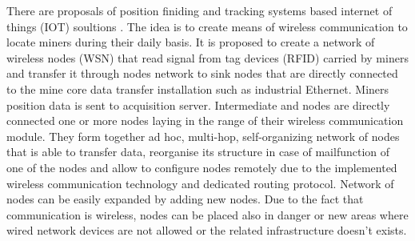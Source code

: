 \documentclass[../main.tex]{subfiles}
\begin{document}
There are proposals of position finiding and tracking systems based internet of things (IOT) soultions \cite{WSN_tracking, WSN_monitoring}. The idea is to create means of wireless communication to locate miners during their daily basis. It is proposed to create a network of wireless nodes (WSN) that read signal from tag devices (RFID) carried by miners and transfer it through nodes network to sink nodes that are directly connected to the mine core data transfer installation such as industrial Ethernet. Miners position data is sent to acquisition server. Intermediate and nodes are directly connected one or more nodes laying in the range of their wireless communication module. They form together ad hoc, multi-hop, self-organizing network of nodes that is able to transfer data, reorganise its structure in case of mailfunction of one of the nodes and allow to configure nodes remotely due to the implemented wireless communication technology and dedicated routing protocol. Network of nodes can be easily expanded by adding new nodes. Due to the fact that communication is wireless, nodes can be placed also in danger or new areas where wired network devices are not allowed or the related infrastructure doesn't exists.
\end{document}
